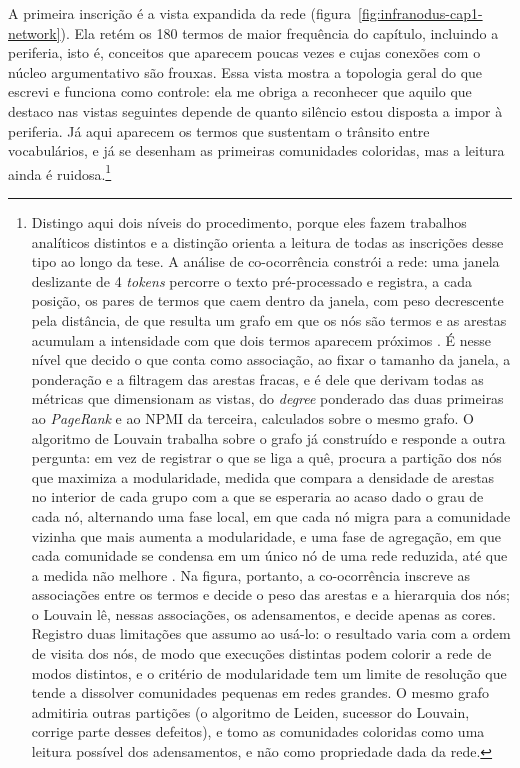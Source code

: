 A primeira inscrição é a vista expandida da rede (figura~\ref{fig:infranodus-cap1-network}). Ela retém os 180 termos de maior frequência do capítulo, incluindo a periferia, isto é, conceitos que aparecem poucas vezes e cujas conexões com o núcleo argumentativo são frouxas. Essa vista mostra a topologia geral do que escrevi e funciona como controle: ela me obriga a reconhecer que aquilo que destaco nas vistas seguintes depende de quanto silêncio estou disposta a impor à periferia. Já aqui aparecem os termos que sustentam o trânsito entre vocabulários, e já se desenham as primeiras comunidades coloridas, mas a leitura ainda é ruidosa.\footnote{Distingo aqui dois níveis do procedimento, porque eles fazem trabalhos analíticos distintos e a distinção orienta a leitura de todas as inscrições desse tipo ao longo da tese. A análise de co-ocorrência constrói a rede: uma janela deslizante de 4 \emph{tokens} percorre o texto pré-processado e registra, a cada posição, os pares de termos que caem dentro da janela, com peso decrescente pela distância, de que resulta um grafo em que os nós são termos e as arestas acumulam a intensidade com que dois termos aparecem próximos \parencite{paranyushkin2019infranodus}. É nesse nível que decido o que conta como associação, ao fixar o tamanho da janela, a ponderação e a filtragem das arestas fracas, e é dele que derivam todas as métricas que dimensionam as vistas, do \emph{degree} ponderado das duas primeiras ao \emph{PageRank} e ao NPMI da terceira, calculados sobre o mesmo grafo. O algoritmo de Louvain trabalha sobre o grafo já construído e responde a outra pergunta: em vez de registrar o que se liga a quê, procura a partição dos nós que maximiza a modularidade, medida que compara a densidade de arestas no interior de cada grupo com a que se esperaria ao acaso dado o grau de cada nó, alternando uma fase local, em que cada nó migra para a comunidade vizinha que mais aumenta a modularidade, e uma fase de agregação, em que cada comunidade se condensa em um único nó de uma rede reduzida, até que a medida não melhore \parencite{Blondel2008Louvain}. Na figura, portanto, a co-ocorrência inscreve as associações entre os termos e decide o peso das arestas e a hierarquia dos nós; o Louvain lê, nessas associações, os adensamentos, e decide apenas as cores. Registro duas limitações que assumo ao usá-lo: o resultado varia com a ordem de visita dos nós, de modo que execuções distintas podem colorir a rede de modos distintos, e o critério de modularidade tem um limite de resolução que tende a dissolver comunidades pequenas em redes grandes. O mesmo grafo admitiria outras partições (o algoritmo de Leiden, sucessor do Louvain, corrige parte desses defeitos), e tomo as comunidades coloridas como uma leitura possível dos adensamentos, e não como propriedade dada da rede.}

